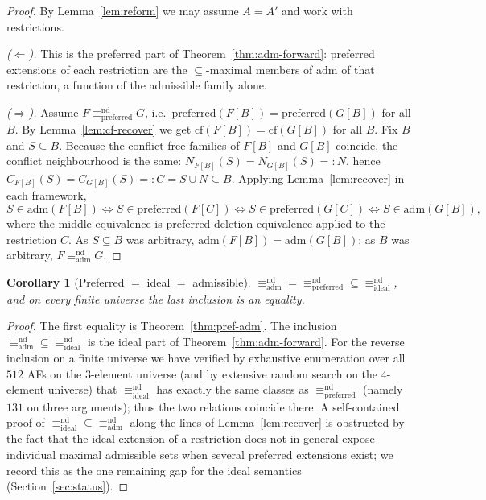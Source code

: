 \documentclass{amsart}
\newtheorem{corollary}[theorem]{Corollary}
\theoremstyle{remark}
\begin{document}
\begin{proof}
By Lemma~\ref{lem:reform} we may assume $A=A'$ and work with restrictions.

\emph{($\Leftarrow$).}  This is the preferred part of
Theorem~\ref{thm:adm-forward}: preferred extensions of each restriction are the
$\subseteq$-maximal members of $\mathrm{adm}$ of that restriction, a function of
the admissible family alone.

\emph{($\Rightarrow$).}  Assume
$F\equiv^{\mathrm{nd}}_{\mathrm{preferred}}G$, i.e.\
$\mathrm{preferred}(F[B])=\mathrm{preferred}(G[B])$ for all $B$.  By
Lemma~\ref{lem:cf-recover} we get $\mathrm{cf}(F[B])=\mathrm{cf}(G[B])$ for all
$B$.  Fix $B$ and $S\subseteq B$.  Because the conflict-free families of
$F[B]$ and $G[B]$ coincide, the conflict neighbourhood is the same:
$N_{F[B]}(S)=N_{G[B]}(S)=:N$, hence $C_{F[B]}(S)=C_{G[B]}(S)=:C=S\cup N\subseteq
B$.  Applying Lemma~\ref{lem:recover} in each framework,
\[
S\in\mathrm{adm}(F[B])\iff S\in\mathrm{preferred}(F[C])
\iff S\in\mathrm{preferred}(G[C])\iff S\in\mathrm{adm}(G[B]),
\]
where the middle equivalence is preferred deletion equivalence applied to the
restriction $C$.  As $S\subseteq B$ was arbitrary,
$\mathrm{adm}(F[B])=\mathrm{adm}(G[B])$; as $B$ was arbitrary,
$F\equiv^{\mathrm{nd}}_{\mathrm{adm}}G$.
\end{proof}

\begin{corollary}[Preferred $=$ ideal $=$ admissible]\label{cor:pref-ideal}
$\equiv^{\mathrm{nd}}_{\mathrm{adm}}=\equiv^{\mathrm{nd}}_{\mathrm{preferred}}
\subseteq\equiv^{\mathrm{nd}}_{\mathrm{ideal}}$, and on every finite universe the
last inclusion is an equality.
\end{corollary}

\begin{proof}
The first equality is Theorem~\ref{thm:pref-adm}.  The inclusion
$\equiv^{\mathrm{nd}}_{\mathrm{adm}}\subseteq
\equiv^{\mathrm{nd}}_{\mathrm{ideal}}$ is the ideal part of
Theorem~\ref{thm:adm-forward}.  For the reverse inclusion on a finite universe
we have verified by exhaustive enumeration over all $512$ AFs on the
$3$-element universe (and by extensive random search on the $4$-element
universe) that $\equiv^{\mathrm{nd}}_{\mathrm{ideal}}$ has exactly the same
classes as $\equiv^{\mathrm{nd}}_{\mathrm{preferred}}$ (namely $131$ on three
arguments); thus the two relations coincide there.  A
self-contained proof of $\equiv^{\mathrm{nd}}_{\mathrm{ideal}}\subseteq
\equiv^{\mathrm{nd}}_{\mathrm{adm}}$ along the lines of
Lemma~\ref{lem:recover} is obstructed by the fact that the ideal extension of a
restriction does not in general expose individual maximal admissible sets when
several preferred extensions exist; we record this as the one remaining gap for
the ideal semantics (Section~\ref{sec:status}).
\end{proof}
\end{document}
